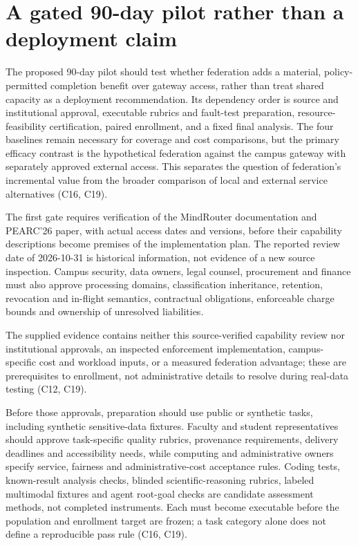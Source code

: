 \documentclass[11pt]{article}
\begin{document}
\section{A gated 90-day pilot rather than a deployment claim}
The proposed 90-day pilot should test whether federation adds a material, policy-permitted completion benefit over gateway access, rather than treat shared capacity as a deployment recommendation. Its dependency order is source and institutional approval, executable rubrics and fault-test preparation, resource-feasibility certification, paired enrollment, and a fixed final analysis. The four baselines remain necessary for coverage and cost comparisons, but the primary efficacy contrast is the hypothetical federation against the campus gateway with separately approved external access. This separates the question of federation\textquoteright{}s incremental value from the broader comparison of local and external service alternatives (C16, C19).

The first gate requires verification of the MindRouter documentation and PEARC\textquoteright{}26 paper, with actual access dates and versions, before their capability descriptions become premises of the implementation plan. The reported review date of 2026-10-31 is historical information, not evidence of a new source inspection. Campus security, data owners, legal counsel, procurement and finance must also approve processing domains, classification inheritance, retention, revocation and in-flight semantics, contractual obligations, enforceable charge bounds and ownership of unresolved liabilities.

The supplied evidence contains neither this source-verified capability review nor institutional approvals, an inspected enforcement implementation, campus-specific cost and workload inputs, or a measured federation advantage; these are prerequisites to enrollment, not administrative details to resolve during real-data testing (C12, C19).

Before those approvals, preparation should use public or synthetic tasks, including synthetic sensitive-data fixtures. Faculty and student representatives should approve task-specific quality rubrics, provenance requirements, delivery deadlines and accessibility needs, while computing and administrative owners specify service, fairness and administrative-cost acceptance rules. Coding tests, known-result analysis checks, blinded scientific-reasoning rubrics, labeled multimodal fixtures and agent root-goal checks are candidate assessment methods, not completed instruments. Each must become executable before the population and enrollment target are frozen; a task category alone does not define a reproducible pass rule (C16, C19).
\end{document}

